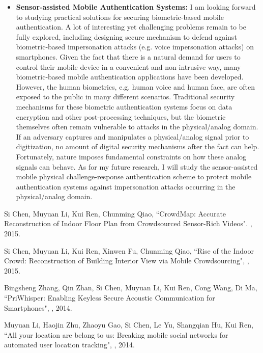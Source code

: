 \documentclass[11pt]{article}
\begin{document}
\begin{itemize}
\item \textbf{Sensor-assisted Mobile Authentication Systems:} I am looking forward to studying practical solutions for securing biometric-based mobile authentication. A lot of interesting yet challenging problems remain to be fully explored, including designing secure mechanism to defend against biometric-based impersonation attacks (e.g. voice impersonation attacks) on smartphones. Given the fact that there is a natural demand for users to control their mobile device in a convenient and non-intrusive way, many biometric-based mobile authentication applications have been developed. However, the human biometrics, e.g. human voice and human face, are often exposed to the public in many different scenarios. Traditional security mechanisms for these biometric authentication systems focus on data encryption and other post-processing techniques, but the biometric themselves often remain vulnerable to attacks in the physical/analog domain. If an adversary captures and manipulates a physical/analog signal prior to digitization, no amount of digital security mechanisms after the fact can help. Fortunately, nature imposes fundamental constraints on how these analog signals can behave. As for my future research, I will study the sensor-assisted mobile physical challenge-response authentication scheme to protect mobile authentication systems against impersonation attacks occurring in the physical/analog domain.



\end{itemize}

\renewcommand{\refname}{Selected Publications}
\begin{thebibliography}{99}
\newblock Si Chen, Muyuan Li, Kui Ren, Chunming Qiao,
\newblock ``CrowdMap: Accurate Reconstruction of Indoor Floor Plan from Crowdsourced Sensor-Rich Videos".
, 2015.


\newblock Si Chen, Muyuan Li, Kui Ren, Xinwen Fu, Chunming Qiao,
\newblock ``Rise of the Indoor Crowd: Reconstruction of Building Interior View via Mobile Crowdsourcing",
, 2015.


\newblock Bingsheng Zhang, Qin Zhan, Si Chen, Muyuan Li, Kui Ren, Cong Wang, Di Ma,
\newblock ``PriWhisper: Enabling Keyless Secure Acoustic Communication for Smartphones",
, 2014.


\newblock Muyuan Li, Haojin Zhu, Zhaoyu Gao, Si Chen, Le Yu, Shangqian Hu, Kui Ren,
\newblock ``All your location are belong to us: Breaking mobile social networks for automated user location tracking",
, 2014.



\end{thebibliography}
\end{document}
